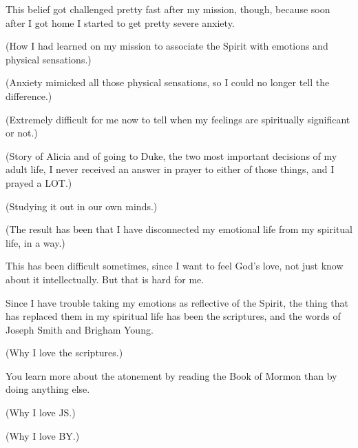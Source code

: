 \begin{compactitem}
			\item This belief got challenged pretty fast after my mission, though, because soon after I got home I started to get pretty severe anxiety.
				\begin{compactitem}
					\item (How I had learned on my mission to associate the Spirit with emotions and physical sensations.)
					\item (Anxiety mimicked all those physical sensations, so I could no longer tell the difference.)
					\item (Extremely difficult for me now to tell when my feelings are spiritually significant or not.)
					\item (Story of Alicia and of going to Duke, the two most important decisions of my adult life, I never received an answer in prayer to either of those things, and I prayed a LOT.)
					\item (Studying it out in our own minds.)
					\item (The result has been that I have disconnected my emotional life from my spiritual life, in a way.)
					\item This has been difficult sometimes, since I want to feel God's love, not just know about it intellectually. But that is hard for me.
				\end{compactitem}
				
			\item Since I have trouble taking my emotions as reflective of the Spirit, the thing that has replaced them in my spiritual life has been the scriptures, and the words of Joseph Smith and Brigham Young.
				\begin{compactitem}
					\item (Why I love the scriptures.)
					\item You learn more about the atonement by reading the Book of Mormon than by doing anything else.
					\item (Why I love JS.)
					\item (Why I love BY.)
				\end{compactitem}
				

\end{compactitem}
